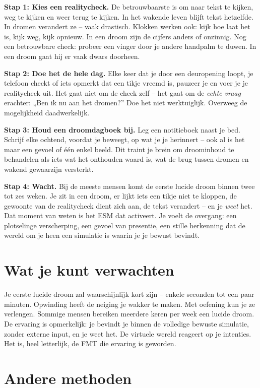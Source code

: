\documentclass[11pt, twoside, openright]{book}
\begin{document}
\textbf{Stap 1: Kies een realitycheck.} De betrouwbaarste is om naar tekst te kijken, weg te kijken en weer terug te kijken. In het wakende leven blijft tekst hetzelfde. In dromen verandert ze -- vaak drastisch. Klokken werken ook: kijk hoe laat het is, kijk weg, kijk opnieuw. In een droom zijn de cijfers anders of onzinnig. Nog een betrouwbare check: probeer een vinger door je andere handpalm te duwen. In een droom gaat hij er vaak dwars doorheen.

\textbf{Stap 2: Doe het de hele dag.} Elke keer dat je door een deuropening loopt, je telefoon checkt of iets opmerkt dat een tikje vreemd is, pauzeer je en voer je je realitycheck uit. Het gaat niet om de check zelf -- het gaat om de \textit{echte vraag} erachter: „Ben ik nu aan het dromen?” Doe het niet werktuiglijk. Overweeg de mogelijkheid daadwerkelijk.

\textbf{Stap 3: Houd een droomdagboek bij.} Leg een notitieboek naast je bed. Schrijf elke ochtend, voordat je beweegt, op wat je je herinnert -- ook al is het maar een gevoel of één enkel beeld. Dit traint je brein om droominhoud te behandelen als iets wat het onthouden waard is, wat de brug tussen dromen en wakend gewaarzijn versterkt.

\textbf{Stap 4: Wacht.} Bij de meeste mensen komt de eerste lucide droom binnen twee tot zes weken. Je zit in een droom, er lijkt iets een tikje niet te kloppen, de gewoonte van de realitycheck dient zich aan, de tekst verandert -- en je \textit{weet} het. Dat moment van weten is het ESM dat activeert. Je voelt de overgang: een plotselinge verscherping, een gevoel van presentie, een stille herkenning dat de wereld om je heen een simulatie is waarin je je bewust bevindt.

\section*{Wat je kunt verwachten}

Je eerste lucide droom zal waarschijnlijk kort zijn -- enkele seconden tot een paar minuten. Opwinding heeft de neiging je wakker te maken. Met oefening kun je ze verlengen. Sommige mensen bereiken meerdere keren per week een lucide droom. De ervaring is opmerkelijk: je bevindt je binnen de volledige bewuste simulatie, zonder externe input, en je weet het. De virtuele wereld reageert op je intenties. Het is, heel letterlijk, de FMT die ervaring is geworden.

\section*{Andere methoden}
\end{document}
